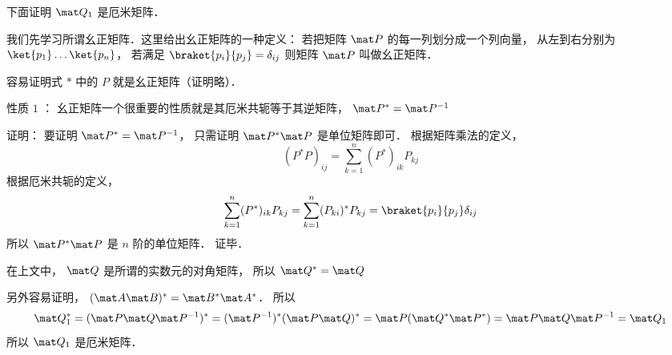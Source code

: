 下面证明 $\mat Q_1$ 是厄米矩阵．

我们先学习所谓幺正矩阵．这里给出幺正矩阵的一种定义： 若把矩阵 $\mat P$ 的每一列划分成一个列向量， 从左到右分别为$\ket{p_1} \dots\ket{p_n}$，  若满足 $\braket{p_i}{p_j}=\delta_{ij}$ 则矩阵 $\mat P$ 叫做幺正矩阵．

容易证明式 $*$ 中的 $P$ 就是幺正矩阵（证明略）．

性质 $1$ ： 幺正矩阵一个很重要的性质就是其厄米共轭等于其逆矩阵， $\mat P^* = \mat P^{- 1}$

证明： 要证明 $\mat P^* = \mat P^{-1}$，  只需证明 $\mat P^* \mat P$ 是单位矩阵即可． 根据矩阵乘法的定义，
\begin{equation}
(P^* P)_{ij} = \sum_{k=1}^n (P^*)_{ik}P_{kj}
\end{equation}
根据厄米共轭的定义，
\begin{equation}
\sum_{k=1}^n (P^*)_{ik}P_{kj}  = \sum_{k=1}^n (P_{ki})^* P_{kj}  = \braket{p_i}{p_j} \delta_{ij}
\end{equation}
所以 $\mat P^* \mat P$ 是 $n$ 阶的单位矩阵．  证毕．

在上文中， $\mat Q$ 是所谓的实数元的对角矩阵， 所以 $\mat Q^* = \mat Q$

另外容易证明， $(\mat A\mat B)^* = \mat B^* \mat A^*$．  所以
\begin{equation}
\mat Q_1^* = (\mat P\mat Q\mat P^{-1})^* = (\mat P^{-1})^* (\mat P\mat Q)^* = \mat P(\mat Q^* \mat P^*) = \mat P\mat Q\mat P^{-1} = \mat Q_1
\end{equation}
所以 $\mat Q_1$ 是厄米矩阵．

